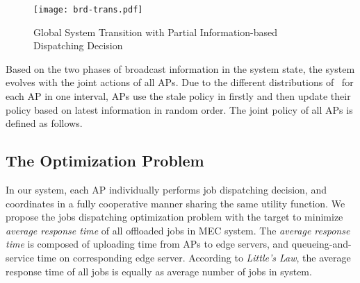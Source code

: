 \begin{figure}[ht]
    \centering
    \texttt{[image: brd-trans.pdf]}
    \caption{Global System Transition with Partial Information-based Dispatching Decision}
    \label{fig:brd-trans}
\end{figure}

Based on the two phases of broadcast information in the system state, the system evolves with the joint actions of all APs.
Due to the different distributions of \brdelay~for each AP in one interval, APs use the stale policy in firstly and then update their policy based on latest information in random order.
The joint policy of all APs is defined as follows.

\subsection{The Optimization Problem}
In our system, each AP individually performs job dispatching decision, and coordinates in a fully cooperative manner sharing the same utility function.
We propose the jobs dispatching optimization problem with the target to minimize \emph{average response time} of all offloaded jobs in MEC system.
The \emph{average response time} is composed of uploading time from APs to edge servers, and queueing-and-service time on corresponding edge server. According to \emph{Little's Law}, the average response time of all jobs is equally as average number of jobs in system.

